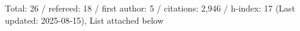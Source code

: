 Total: 26 / refereed: 18 / first author: 5 / citations: 2,946 / h-index: 17 (Last updated: 2025-08-15), List attached below